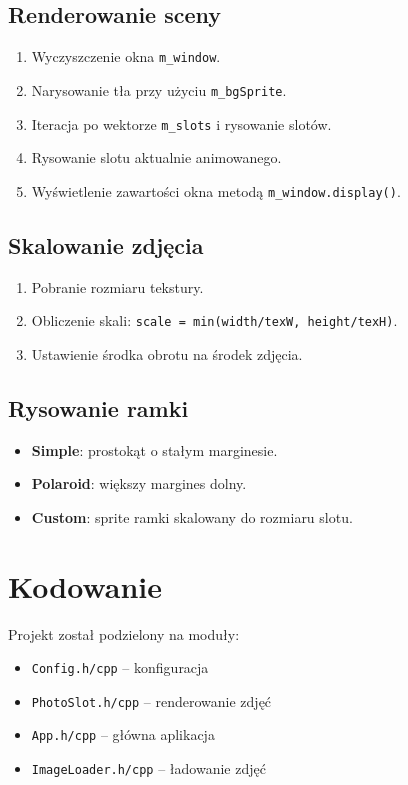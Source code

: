 \documentclass[12pt]{article}
\begin{document}
\subsection{Renderowanie sceny}
\begin{enumerate}
    \item Wyczyszczenie okna \texttt{m\_window}.
    \item Narysowanie tła przy użyciu \texttt{m\_bgSprite}.
    \item Iteracja po wektorze \texttt{m\_slots} i rysowanie slotów.
    \item Rysowanie slotu aktualnie animowanego.
    \item Wyświetlenie zawartości okna metodą \texttt{m\_window.display()}.
\end{enumerate}

\subsection{Skalowanie zdjęcia}
\begin{enumerate}
    \item Pobranie rozmiaru tekstury.
    \item Obliczenie skali: \texttt{scale = min(width/texW, height/texH)}.
    \item Ustawienie środka obrotu na środek zdjęcia.
\end{enumerate}

\subsection{Rysowanie ramki}
\begin{itemize}
    \item \textbf{Simple}: prostokąt o stałym marginesie.
    \item \textbf{Polaroid}: większy margines dolny.
    \item \textbf{Custom}: sprite ramki skalowany do rozmiaru slotu.
\end{itemize}

\section{Kodowanie}
Projekt został podzielony na moduły:
\begin{itemize}
    \item \texttt{Config.h/cpp} – konfiguracja
    \item \texttt{PhotoSlot.h/cpp} – renderowanie zdjęć
    \item \texttt{App.h/cpp} – główna aplikacja
    \item \texttt{ImageLoader.h/cpp} – ładowanie zdjęć
\end{itemize}
\end{document}
